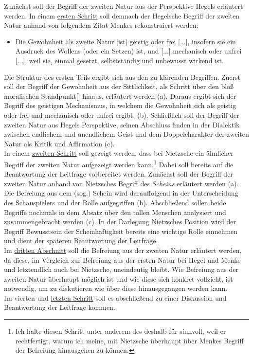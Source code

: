\documentclass[12pt, a4paper, openany]{report}
\begin{document}
Zunächst soll der Begriff der zweiten Natur aus der Perspektive Hegels erläutert werden. 
In einem \hyperref[abschnitt_1]{ersten Schritt} soll demnach der Hegelsche Begriff der zweiten Natur anhand von folgendem Zitat Menkes rekonstruiert werden:
\begin{itemize}
    \item[] Die Gewohnheit als zweite Natur [ist] geistig oder frei [...], insofern sie ein Ausdruck des Wollens (oder ein Setzen) ist, und [...] mechanisch oder unfrei [...], weil sie, einmal gesetzt, selbstständig und unbewusst wirkend ist.
\end{itemize}
Die Struktur des ersten Teils ergibt sich aus den zu klärenden Begriffen. 
Zuerst soll der Begriff der Gewohnheit aus der Sittlichkeit, als Schritt über den \glqq bloß moralischen Standpunkt[]\grqq{} hinaus, erläutert werden (a). 
Daraus ergibt sich der Begriff des \glqq geistigen Mechanismus\grqq, in welchem die Gewohnheit sich als \glqq geistig oder frei\grqq{} und \glqq mechanisch oder unfrei\grqq{} ergibt. (b).
Schließlich soll der Begriff der zweiten Natur aus Hegels Perspektive, seinen Abschluss finden in der Dialektik zwischen endlichem und unendlichem Geist und dem Doppelcharakter der zweiten Natur als Kritik und Affirmation (c).\\
In einem \hyperref[abschnitt_2]{zweiten Schritt} soll gezeigt werden, dass bei Nietzsche ein ähnlicher Begriff der zweiten Natur aufgezeigt werden kann.\footnote{Ich halte diesen Schritt unter anderem des deshalb für sinnvoll, weil er rechtfertigt, warum ich meine, mit Nietzsche überhaupt über Menkes Begriff der Befreiung hinausgehen zu können.}
Dabei soll bereits auf die Beantwortung der Leitfrage vorbereitet werden.
Zunächst soll der Begriff der zweiten Natur anhand von Nietzsches Begriff des \textit{Scheins} erläutert werden (a).
Die Befreiung aus dem (sog.) Schein wird darauffolgend in der Unterscheidung des Schauspielers und der Rolle aufgegriffen (b). 
Abschließend sollen beide Begriffe nochmals in dem Absatz über den tollen Menschen analysiert und zusammengebracht werden (c).
In der Darlegung Nietzsches Position wird der Begriff \glqq Bewusstsein der Scheinhaftigkeit\grqq{} bereits eine wichtige Rolle einnehmen und dient der späteren Beantwortung der Leitfrage.\\
Im \hyperref[abschnitt_3]{dritten Abschnitt} soll die Befreiung aus der zweiten Natur erläutert werden, da diese, im Vergleich zur Befreiung aus der ersten Natur bei Hegel und Menke und letztendlich auch bei Nietzsche, uneindeutig bleibt.
Wie Befreiung aus der zweiten Natur überhaupt möglich ist und wie diese sich konkret vollzieht, ist notwendig, um zu diskutieren wie über diese hinausgegangen werden kann.\\
Im vierten und \hyperref[abschnitt_4]{letzten Schritt} soll es abschließend zu einer Diskussion und Beantwortung der Leitfrage kommen. 
\end{document}
